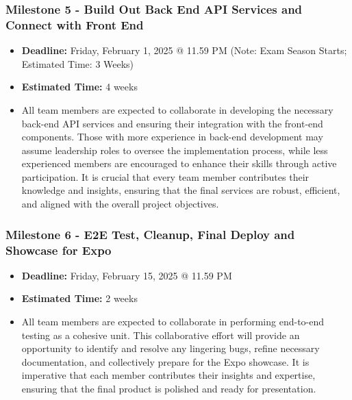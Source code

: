 \documentclass{article}
\begin{document}
\subsubsection*{Milestone 5 - Build Out Back End API Services and Connect with Front End}
\begin{itemize}
    \item \textbf{Deadline:} Friday, February 1, 2025 @ 11.59 PM (Note: Exam Season Starts; Estimated Time: 3 Weeks)
    \item \textbf{Estimated Time:} 4 weeks
    \item All team members are expected to collaborate in developing the necessary back-end API services and ensuring their integration with the front-end components. Those with more experience in back-end development may assume leadership roles to oversee the implementation process, while less experienced members are encouraged to enhance their skills through active participation. It is crucial that every team member contributes their knowledge and insights, ensuring that the final services are robust, efficient, and aligned with the overall project objectives.
\end{itemize}

\subsubsection*{Milestone 6 - E2E Test, Cleanup, Final Deploy and Showcase for Expo}
\begin{itemize}
    \item \textbf{Deadline:} Friday, February 15, 2025 @ 11.59 PM
    \item \textbf{Estimated Time:} 2 weeks
    \item All team members are expected to collaborate in performing end-to-end testing as a cohesive unit. This collaborative effort will provide an opportunity to identify and resolve any lingering bugs, refine necessary documentation, and collectively prepare for the Expo showcase. It is imperative that each member contributes their insights and expertise, ensuring that the final product is polished and ready for presentation.
\end{itemize}
\end{document}
